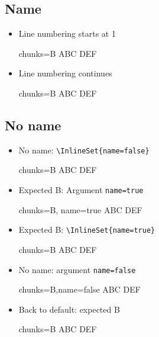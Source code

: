\documentclass{article}
\begin{document}
\subsection{Name}
\begin{itemize}
\item Line numbering starts at 1
\begin{Inline}{chunks=B}
ABC
DEF
\end{Inline}
\item Line numbering continues
\begin{Inline}{chunks=B}
ABC
DEF
\end{Inline}
\end{itemize}
\subsection{No name}
\begin{itemize}
\item
{}
No name: \verb|\InlineSet{name=false}|
\begin{Inline}{chunks=B}
ABC
DEF
\end{Inline}
\item
Expected B: Argument \verb|name=true|
\begin{Inline}{chunks=B, name=true}
ABC
DEF
\end{Inline}
\item
Expected B: \verb|\InlineSet{name=true}|
\begin{Inline}{chunks=B}
ABC
DEF
\end{Inline}
\item
No name: argument \verb|name=false|
\begin{Inline}{chunks=B,name=false}
ABC
DEF
\end{Inline}
\item
Back to default: expected B
\begin{Inline}{chunks=B}
ABC
DEF
\end{Inline}
\end{itemize}
\end{document}
